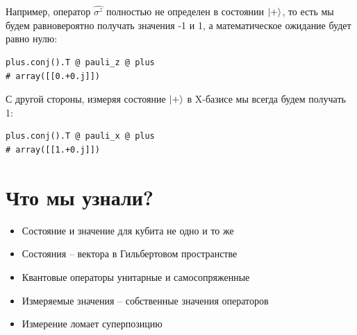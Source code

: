 \documentclass[11pt]{article}
\begin{document}
Например, оператор \(\hat{\sigma^z}\) полностью не определен в состоянии \(\ket{+}\), то есть мы будем равновероятно получать значения -1 и 1, а математическое ожидание будет равно нулю:
\begin{verbatim}
plus.conj().T @ pauli_z @ plus
# array([[0.+0.j]])
\end{verbatim}

С другой стороны, измеряя состояние \(\ket{+}\) в X-базисе мы всегда будем получать 1:
\begin{verbatim}
plus.conj().T @ pauli_x @ plus
# array([[1.+0.j]])
\end{verbatim}

\section{Что мы узнали?}
\label{sec:org27438ed}
\begin{itemize}
\item Состояние и значение для кубита не одно и то же
\item Состояния -- вектора в Гильбертовом пространстве
\item Квантовые операторы унитарные и самосопряженные
\item Измеряемые значения -- собственные значения операторов
\item Измерение ломает суперпозицию
\end{itemize}
\end{document}
